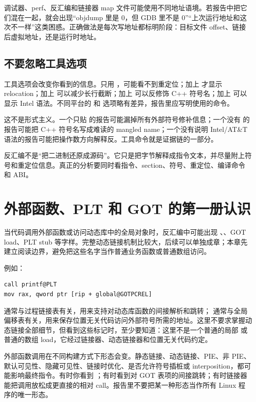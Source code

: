 调试器、perf、反汇编和链接器 map 文件可能使用不同地址语境。若报告中把它们混在一起，就会出现“objdump 里是 0，但 GDB 里不是 0”“上次运行地址和这次不一样”这类困惑。正确做法是每次写地址都标明阶段：目标文件 offset、链接后虚拟地址，还是运行时地址。

\subsection{不要忽略工具选项}

工具选项会改变你看到的信息。只用 ，可能看不到重定位；加上  才显示 relocation；加上  可以减少长行截断；加上  可以反修饰 C++ 符号名；加上  可以显示 Intel 语法。不同平台的  和  选项略有差异，报告里应写明使用的命令。

这不是形式主义。一个只贴  的报告可能漏掉所有外部符号修补信息；一个没有  的报告可能把 C++ 符号名写成难读的 mangled name；一个没有说明 Intel/AT\&T 语法的报告可能把操作数方向解释反。工具命令就是证据链的一部分。

\begin{keyidea}
反汇编不是“把二进制还原成源码”。它只是把字节解释成指令文本，并尽量附上符号和重定位信息。真正的分析要同时看指令、section、符号、重定位、编译命令和 ABI。
\end{keyidea}

\section{外部函数、PLT 和 GOT 的第一册认识}

当代码调用外部函数或访问动态库中的全局对象时，反汇编中可能出现 、、GOT load、PLT stub 等字样。完整动态链接机制比较大，后续可以单独成章；本章先建立阅读边界，避免把这些名字当作普通业务函数或普通数组访问。

例如：

\begin{lstlisting}
call printf@PLT
mov rax, qword ptr [rip + global@GOTPCREL]
\end{lstlisting}

 通常与过程链接表有关，用来支持对动态库函数的间接解析和跳转； 通常与全局偏移表有关，用来保存位置无关代码访问外部符号所需的地址。这里不要求掌握动态链接全部细节，但看到这些标记时，至少要知道：这里不是一个普通的局部  或普通的数组 load，它经过链接器、动态链接器和位置无关代码约定。

外部函数调用在不同构建方式下形态会变。静态链接、动态链接、PIE、非 PIE、默认可见性、隐藏可见性、链接时优化、是否允许符号插桩或 interposition，都可能影响最终指令。有时你看到 ；有时看到对 GOT 表项的间接跳转；有时链接器能把调用放松成更直接的相对 call。报告里不要把某一种形态当作所有 Linux 程序的唯一形态。


